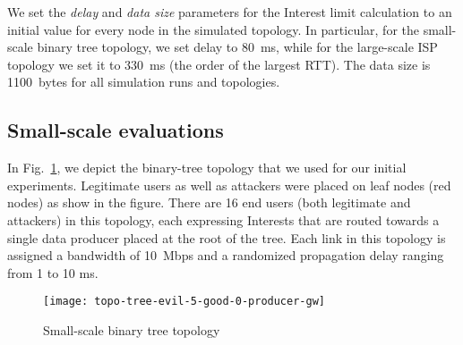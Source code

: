 We set the \emph{delay} and \emph{data size} parameters for the Interest limit calculation to an initial %
value for every node in the simulated topology. In particular, for the small-scale binary tree topology, we set delay to 80~ms, while for the large-scale ISP topology we set it to 330~ms (the order of the largest RTT). The data size is 1100~bytes for all simulation runs and topologies.



\subsection{Small-scale evaluations}
\label{sec:small-scale}

In Fig.~\ref{fig:small-scale}, we depict the binary-tree topology that we used for our initial experiments.
Legitimate users as well as attackers were placed on leaf nodes (red nodes) as show in the figure. There are 16 end users (both legitimate and attackers) in this topology, each expressing Interests that are routed towards a single data producer placed at the root of the tree.  Each link in this topology is assigned a bandwidth of 10~Mbps and a randomized propagation delay ranging from 1 to 10 ms. 


\begin{figure}[]
  \centering
  \texttt{[image: topo-tree-evil-5-good-0-producer-gw]}
  \caption{Small-scale binary tree topology}
  \label{fig:small-scale}
\end{figure}


